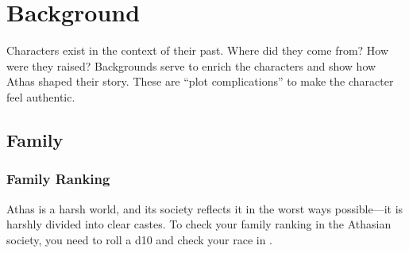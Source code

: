 \section{Background}
Characters exist in the context of their past. Where did they come from? How were they raised? Backgrounds serve to enrich the characters and show how Athas shaped their story. These are ``plot complications'' to make the character feel authentic.

\subsection{Family}

\subsubsection{Family Ranking}
Athas is a harsh world, and its society reflects it in the worst ways possible---it is harshly divided into clear castes. To check your family ranking in the Athasian society, you need to roll a d10 and check your race in .

